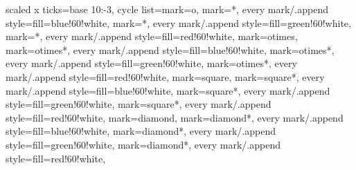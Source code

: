 \documentclass[a4paper]{article}
\begin{document}
\pgfplotsset
{scaled x ticks=base 10:-3,
 cycle list={{mark=o}, {mark=*, every mark/.append style={fill=blue!60!white}},
             {mark=*, every mark/.append style={fill=green!60!white}}, {mark=*, every mark/.append style={fill=red!60!white}},
             {mark=otimes}, {mark=otimes*, every mark/.append style={fill=blue!60!white}},
             {mark=otimes*, every mark/.append style={fill=green!60!white}}, {mark=otimes*, every mark/.append style={fill=red!60!white}},
             {mark=square}, {mark=square*, every mark/.append style={fill=blue!60!white}},
             {mark=square*, every mark/.append style={fill=green!60!white}}, {mark=square*, every mark/.append style={fill=red!60!white}},
             {mark=diamond}, {mark=diamond*, every mark/.append style={fill=blue!60!white}},
             {mark=diamond*, every mark/.append style={fill=green!60!white}}, {mark=diamond*, every mark/.append style={fill=red!60!white}}},
}
\end{document}
